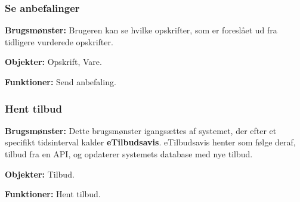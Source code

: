 \subsubsection*{Se anbefalinger}
\textbf{Brugsmønster:} Brugeren kan se hvilke opskrifter, som er foreslået ud fra tidligere vurderede opskrifter.

\textbf{Objekter:} Opskrift, Vare.

\textbf{Funktioner:} Send anbefaling.

\subsubsection*{Hent tilbud}
\textbf{Brugsmønster:} Dette brugsmønster igangsættes af systemet, der efter et specifikt tidsinterval kalder \textbf{eTilbudsavis}.
eTilbudsavis henter som følge deraf, tilbud fra en API, og opdaterer systemets database med nye tilbud.

\textbf{Objekter:} Tilbud.

\textbf{Funktioner:} Hent tilbud.
